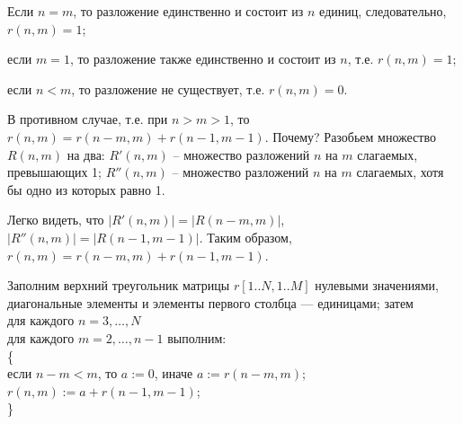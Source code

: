 Если $n=m$, то разложение единственно и состоит из $n$ единиц, следовательно, $r(n,m)=1$;

если $m=1$, то разложение также единственно и состоит из $n$, т.е. $r(n,m)=1$;

если $n<m$, то разложение не существует, т.е. $r(n,m)=0$.

В противном случае, т.е. при $n>m>1$, то
$r(n,m)= r(n-m, m) + r(n-1, m-1)$. Почему?
Разобьем множество $R(n,m)$ на два:
$R'(n,m)$ -- множество разложений $n$ на $m$ слагаемых, превышающих 1;
$R''(n,m)$ -- множество разложений $n$ на $m$ слагаемых, хотя бы одно из которых равно 1.

Легко видеть, что $|R'(n,m)|= |R(n-m,m)|$, $|R''(n,m)|=|R(n-1,m-1)|$. Таким образом, $r(n,m)= r(n-m, m) + r(n-1, m-1)$.

Заполним верхний треугольник матрицы $r[1..N, 1..M]$ нулевыми значениями, диагональные элементы и элементы первого столбца --- единицами; затем\\
для каждого $n=3,…,N$\\
для каждого $m=2,…, n-1$ выполним:\\
\{\\
если $n-m<m$, то $a:=0$, иначе $a:=r(n-m,m)$;\\
$r(n,m):= a + r(n-1, m-1)$;\\
\}\\

